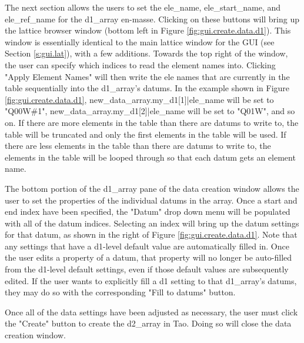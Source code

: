 The next section allows the users to set the ele_name, ele_start_name, and ele_ref_name for the d1_array en-masse.
Clicking on these buttons will bring up the lattice browser window (bottom left in Figure \ref{fig:gui.create.data.d1}).
This window is essentially identical to the main lattice window for the GUI (see Section \ref{s:gui.lat}), with a few additions.
Towards the top right of the window, the user can specify which indices to read the element names into.
Clicking "Apply Element Names" will then write the ele names that are currently in the table sequentially into the d1_array's datums.
In the example shown in Figure \ref{fig:gui.create.data.d1}, new_data_array.my_d1[1]|ele_name will be set to "Q00W\#1", new_data_array.my_d1[2]|ele_name will be set to "Q01W", and so on.
If there are more elements in the table than there are datums to write to, the table will be truncated and only the first elements in the table will be used.
If there are less elements in the table than there are datums to write to, the elements in the table will be looped through so that each datum gets an element name.

The bottom portion of the d1_array pane of the data creation window allows the user to set the properties of the individual datums in the array.
Once a start and end index have been specified, the "Datum" drop down menu will be populated with all of the datum indices.
Selecting an index will bring up the datum settings for that datum, as shown in the right of Figure \ref{fig:gui.create.data.d1}.
Note that any settings that have a d1-level default value are automatically filled in.
Once the user edits a property of a datum, that property will no longer be auto-filled from the d1-level default settings, even if those default values are subsequently edited.
If the user wants to explicitly fill a d1 setting to that d1_array's datums, they may do so with the corresponding "Fill to datums" button.

Once all of the data settings have been adjusted as necessary, the user must click the "Create" button to create the d2_array in Tao.  Doing so will close the data creation window.

